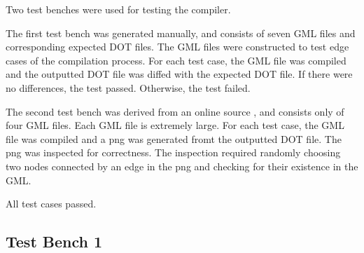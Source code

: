 \documentclass[a4paper]{report}
\begin{document}
Two test benches were used for testing the compiler. 

The first test bench was generated manually, and consists of seven GML files and corresponding expected DOT files. The GML files were constructed to test edge cases of the compilation process. For each test case, the GML file was compiled and the outputted DOT file was diffed with the expected DOT file. If there were no differences, the test passed. Otherwise, the test failed.

The second test bench was derived from an online source \cite{TESTBENCH2}, and consists only of four GML files. Each GML file is extremely large. For each test case, the GML file was compiled and a png was generated fromt the outputted DOT file. The png was inspected for correctness. The inspection required randomly choosing two nodes connected by an edge in the png and checking for their existence in the GML. 

All test cases passed.
\newpage
\subsection{Test Bench 1}
\end{document}
